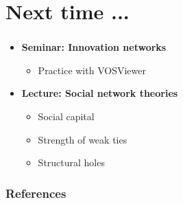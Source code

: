 \documentclass[8pt]{beamer}
\begin{document}
\bgroup
{}
\begin{frame}[plain]{}
\begin{center}
\color{white}{\Huge Questions}
\end{center}
\end{frame}
\egroup




\section*{Next time ...}

\bgroup
{}
\begin{frame}[plain]{}
\begin{center}
\color{white}{\Huge\insertsection}
\end{center}
\end{frame}
\egroup


\begin{frame}
\frametitle{\insertsection}

\begin{itemize}

\item \textbf{Seminar: Innovation networks}
	\begin{itemize}
	\item Practice with VOSViewer
	\end{itemize}
	
\medskip
\medskip

\item  \textbf{Lecture: Social network theories}
	\begin{itemize}
	\item Social capital
	\item Strength of weak ties
	\item Structural holes
	\end{itemize}	

		
\end{itemize}

\end{frame}












\begin{frame}[allowframebreaks]
\frametitle{References}
\tiny


\end{frame}
\end{document}
